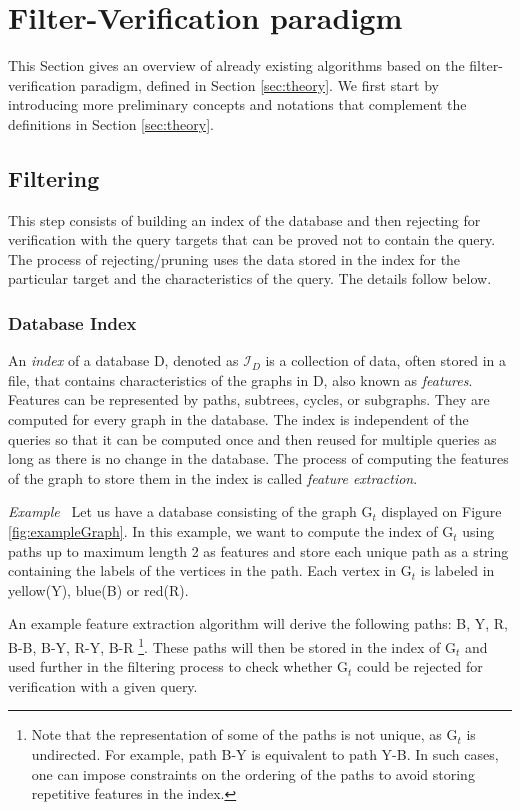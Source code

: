 \documentclass{l4proj}
\newcounter{example}[section]
\newenvironment{example}[1][]{\refstepcounter{example}\par\medskip
   \noindent \textit{Example~\theexample #1} \rmfamily}{\medskip}
\newcommand{\fancyI}{\mathcal{I}}
\begin{document}
\section{Filter-Verification paradigm}
\label{sec:filterVerificationParadigm}
This Section gives an overview of already existing algorithms based on the filter-verification paradigm, defined in Section \ref{sec:theory}. We first start by introducing more preliminary concepts and notations that complement the definitions in Section \ref{sec:theory}. 

\subsection{Filtering}
This step consists of building an index of the database and then rejecting for verification with the query targets that can be proved not to contain the query. The process of rejecting/pruning uses the data stored in the index for the particular target and the characteristics of the query. The details follow below.

\subsubsection{Database Index}
An \emph{index} of a database D, denoted as $\fancyI_{D}$ is a collection of data, often stored in a file, that contains characteristics of the graphs in D, also known as \emph{features}. Features can be represented by paths, subtrees, cycles, or subgraphs. They are computed for every graph in the database. The index is independent of the queries so that it can be computed once and then reused for multiple queries as long as there is no change in the database. The process of computing the features of the graph to store them in the index is called \emph{feature extraction}.

\begin{example}
\label{ex:index}
Let us have a database consisting of the graph G$_{t}$ displayed on Figure \ref{fig:exampleGraph}. In this example, we want to compute the index of G$_{t}$ using paths up to maximum length 2 as features and store each unique path as a string containing the labels of the vertices in the path. Each vertex in G$_{t}$ is labeled in yellow(Y), blue(B) or red(R).

An example feature extraction algorithm will derive the following paths:
B, Y, R, B-B, B-Y, R-Y, B-R \footnote{Note that the representation of some of the paths is not unique, as G$_{t}$ is undirected. For example, path B-Y is equivalent to path Y-B. In such cases, one can impose constraints on the ordering of the paths to avoid storing repetitive features in the index.}. These paths will then be stored in the index of G$_{t}$ and used further in the filtering process to check whether G$_{t}$ could be rejected for verification with a given query.
\end{example}
\end{document}
